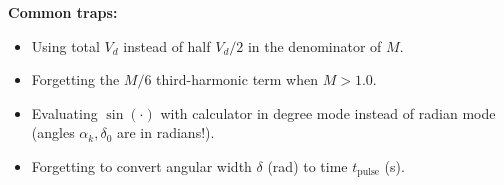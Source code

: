 \textbf{Common traps:}
\begin{itemize}
  \item Using total \(V_d\) instead of half \(V_d/2\) in the denominator of \(M\).
  \item Forgetting the \(M/6\) third-harmonic term when \(M > 1.0\).
  \item Evaluating \(\sin(\cdot)\) with calculator in degree mode instead of radian mode (angles \(\alpha_k, \delta_0\) are in radians!).
  \item Forgetting to convert angular width \(\delta\) (rad) to time \(t_{\mathrm{pulse}}\) (s).
\end{itemize}
